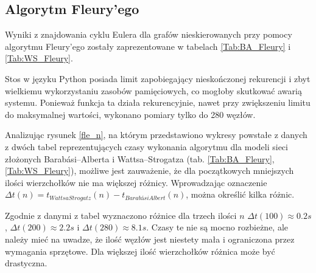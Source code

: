 \documentclass[a4paper, 12pt, twoside, openright]{article}
\begin{document}
\subsection{Algorytm Fleury'ego} \label{Fleu_wyniki}
\indent\par
	Wyniki z znajdowania cyklu Eulera dla grafów nieskierowanych przy pomocy algorytmu Fleury'ego zostały zaprezentowane w tabelach \ref{Tab:BA_Fleury} i \ref{Tab:WS_Fleury}. 
	
	Stos w języku Python posiada limit zapobiegający nieskończonej rekurencji i zbyt wielkiemu wykorzystaniu zasobów pamięciowych, co mogłoby skutkować awarią systemu. Ponieważ funkcja ta działa rekurencyjnie, nawet przy zwiększeniu limitu do maksymalnej wartości, wykonano pomiary tylko do 280 węzłów.

	Analizując rysunek \ref{fle_n}, na którym przedstawiono wykresy powstałe z danych z dwóch tabel reprezentujących czasy wykonania algorytmu dla modeli sieci złożonych Barabási–Alberta i Wattsa–Strogatza (tab. \ref{Tab:BA_Fleury}, \ref{Tab:WS_Fleury}), możliwe jest zauważenie, że dla początkowych mniejszych ilości wierzchołków nie ma większej różnicy. Wprowadzając oznaczenie $\Delta t(n) = t_{WattsaStrogatz}(n) - t_{BarabásiAlbert}(n)$, można określić kilka różnic.
	
	Zgodnie z danymi z tabel wyznaczono różnice dla trzech ilości $n$ $\Delta t(100) \approx 0.2s $, $\Delta t(200) \approx 2.2s $ i  $\Delta t(280) \approx 8.1s$. Czasy te nie są mocno rozbieżne, ale należy mieć na uwadze, że ilość węzłów jest niestety mała i ograniczona przez wymagania sprzętowe. Dla większej ilość wierzchołków różnica może być drastyczna.
\end{document}
